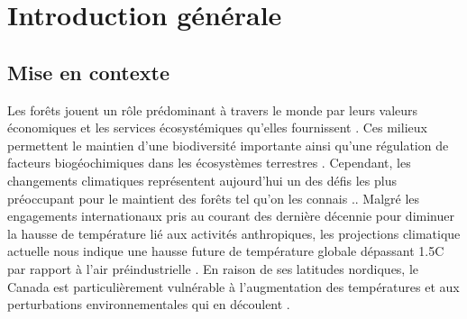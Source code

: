 \chapter*{Introduction générale}         %
\label{chap-introduction}       %

\section*{Mise en contexte}
\label{sec:contexte}

Les forêts jouent un rôle prédominant à travers le monde par leurs valeurs économiques et les services écosystémiques qu'elles fournissent \citep{Balvanera2006Quantifyingevidence}.
Ces milieux permettent le maintien d’une biodiversité importante ainsi qu'une régulation de facteurs biogéochimiques dans les écosystèmes terrestres \citep{Pawson2013Plantationforests}. 
Cependant, les changements climatiques représentent aujourd'hui un des défis les plus préoccupant pour le maintient des forêts tel qu'on les connais \citep{McKenney2009Climatechange,Messier2022Warningnatural,Seidl2017Forestdisturbances,Trumbore2015Foresthealth}..  
Malgré les engagements internationaux pris au courant des dernière décennie pour diminuer la hausse de température lié aux activités anthropiques, 
les projections climatique actuelle nous indique une hausse future de température globale dépassant 1.5C par rapport à l'air préindustrielle \citep{Matthews2022Currentglobal}.
En raison de ses latitudes nordiques, le Canada est particulièrement vulnérable à l'augmentation des températures et aux perturbations environnementales qui en découlent \citep{Alo2008Potentialfuture,Bush2019Canadachanging}. 


